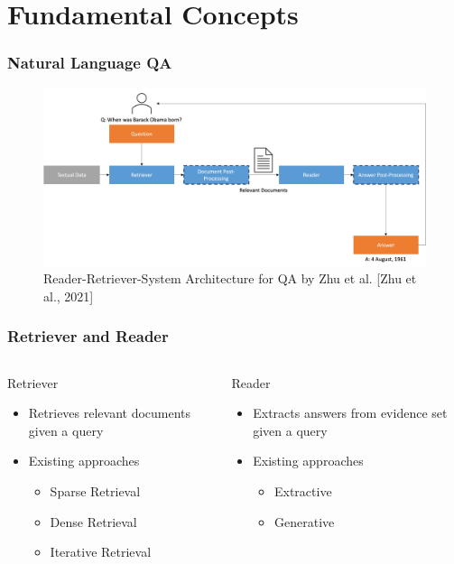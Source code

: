 \documentclass{beamer}
\begin{document}
\section[Fundamentals]{Fundamental Concepts}

\begin{frame}
  \frametitle{Natural Language QA}

  \begin{figure}
    \includegraphics[width=\textwidth]{Grafiken/Retriever_Reader.png}
    \caption{Reader-Retriever-System Architecture for QA by Zhu et al. [Zhu et al., 2021]}
  \end{figure}

\end{frame}

\begin{frame}
  \frametitle{Retriever and Reader}

  \begin{columns}[t]
    \begin{column}{.5\textwidth}
    {\color{unirot}Retriever}
    \begin{itemize}
      \item Retrieves relevant documents given a query
      \item Existing approaches
      \begin{itemize}
        \item Sparse Retrieval
        \item Dense Retrieval
        \item Iterative Retrieval
      \end{itemize}
    \end{itemize}
    \end{column}
    \begin{column}{.5\textwidth}
    {\color{unirot}Reader}
    \begin{itemize}
      \item Extracts answers from evidence set given a query
      \item Existing approaches
      \begin{itemize}
        \item Extractive
        \item Generative
      \end{itemize}
    \end{itemize}
    \end{column}
  \end{columns}

\end{frame}
\end{document}
